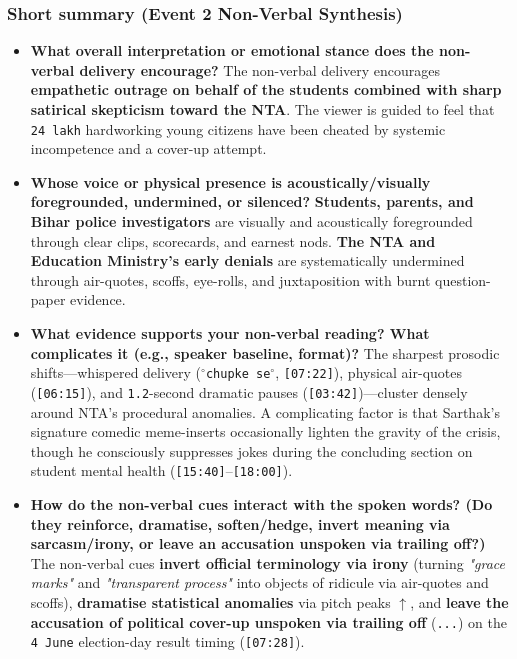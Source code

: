 \documentclass[10pt,a4paper]{article}
\begin{document}
\subsubsection*{Short summary (Event 2 Non-Verbal Synthesis)}

\begin{itemize}
  \item \textbf{What overall interpretation or emotional stance does the non-verbal delivery encourage?}
The non-verbal delivery encourages \textbf{empathetic outrage on behalf of the students combined with sharp satirical skepticism toward the NTA}. The viewer is guided to feel that \texttt{24 lakh} hardworking young citizens have been cheated by systemic incompetence and a cover-up attempt.\par\smallskip
  \item \textbf{Whose voice or physical presence is acoustically/visually foregrounded, undermined, or silenced?}
\textbf{Students, parents, and Bihar police investigators} are visually and acoustically foregrounded through clear clips, scorecards, and earnest nods. \textbf{The NTA and Education Ministry's early denials} are systematically undermined through air-quotes, scoffs, eye-rolls, and juxtaposition with burnt question-paper evidence.\par\smallskip
  \item \textbf{What evidence supports your non-verbal reading? What complicates it (e.g., speaker baseline, format)?}
The sharpest prosodic shifts---whispered delivery (\texttt{$^\circ$chupke se$^\circ$}, \texttt{[07:22]}), physical air-quotes (\texttt{[06:15]}), and \texttt{1.2}-second dramatic pauses (\texttt{[03:42]})---cluster densely around NTA's procedural anomalies. A complicating factor is that Sarthak's signature comedic meme-inserts occasionally lighten the gravity of the crisis, though he consciously suppresses jokes during the concluding section on student mental health (\texttt{[15:40]}--\texttt{[18:00]}).\par\smallskip
  \item \textbf{How do the non-verbal cues interact with the spoken words? (Do they reinforce, dramatise, soften/hedge, invert meaning via sarcasm/irony, or leave an accusation unspoken via trailing off?)}
The non-verbal cues \textbf{invert official terminology via irony} (turning \textit{"grace marks"} and \textit{"transparent process"} into objects of ridicule via air-quotes and scoffs), \textbf{dramatise statistical anomalies} via pitch peaks \texttt{$\uparrow$}, and \textbf{leave the accusation of political cover-up unspoken via trailing off} (\texttt{...}) on the \texttt{4 June} election-day result timing (\texttt{[07:28]}).\par\smallskip

\end{itemize}
\end{document}

